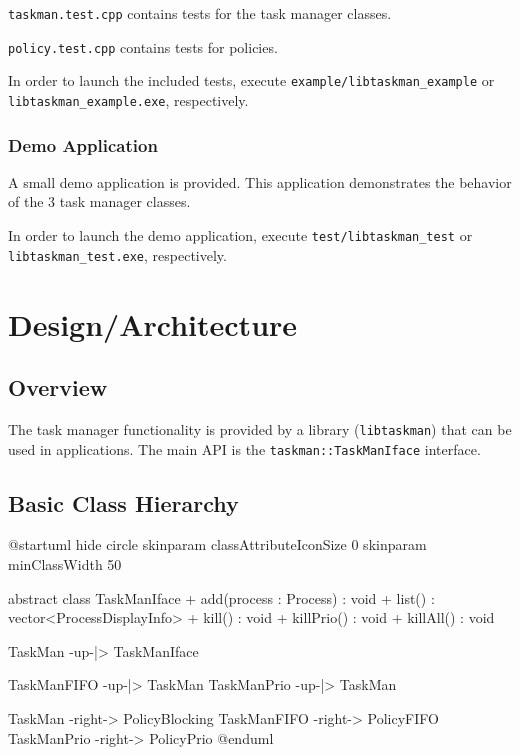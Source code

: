 \documentclass[a4paper]{scrartcl}
\begin{document}
\texttt{taskman.test.cpp} contains tests for the task manager classes.

\texttt{policy.test.cpp} contains tests for policies.

In order to launch the included tests, execute \texttt{example/libtaskman_example} or\\ \texttt{libtaskman_example.exe}, respectively.

\subsubsection{Demo Application}
A small demo application is provided. This application demonstrates the behavior of the 3 task manager classes.

In order to launch the demo application, execute \texttt{test/libtaskman_test} or\\ \texttt{libtaskman_test.exe}, respectively.

\section{Design/Architecture}

\subsection{Overview}
The task manager functionality is provided by a library (\texttt{libtaskman}) that can be used in applications.
The main API is the \texttt{taskman::TaskManIface} interface.

\subsection{Basic Class Hierarchy}

\begin{plantuml}
@startuml
hide circle
skinparam classAttributeIconSize 0
skinparam minClassWidth 50

abstract  class TaskManIface {
+ add(process : Process) : void
+ list() : vector<ProcessDisplayInfo>
+ kill() : void
+ killPrio() : void
+ killAll() : void
}

TaskMan -up-|> TaskManIface

TaskManFIFO -up-|> TaskMan
TaskManPrio -up-|> TaskMan

TaskMan -right-> PolicyBlocking
TaskManFIFO -right-> PolicyFIFO
TaskManPrio -right-> PolicyPrio
@enduml
\end{plantuml}
\end{document}
